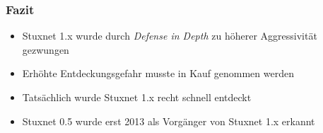 \documentclass{beamer}
\begin{document}
\begin{frame}
  \frametitle{Fazit}
  \begin{itemize}
    \item Stuxnet 1.x wurde durch \emph{Defense in Depth} zu höherer Aggressivität gezwungen
    \item Erhöhte Entdeckungsgefahr musste in Kauf genommen werden
    \item Tatsächlich wurde Stuxnet 1.x recht schnell entdeckt
    \item Stuxnet 0.5 wurde erst 2013 als Vorgänger von Stuxnet 1.x erkannt
  \end{itemize}
\end{frame}
\end{document}
